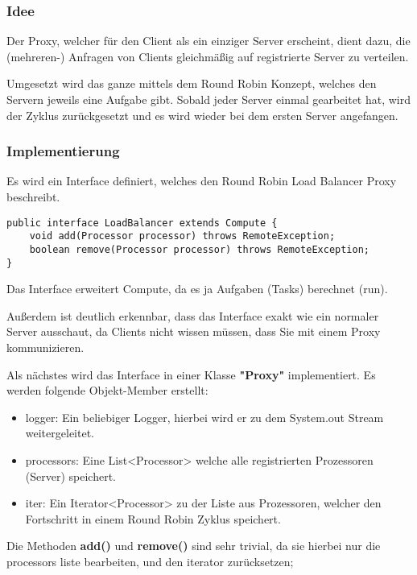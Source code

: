 \subsubsection{Idee}
Der Proxy, welcher für den Client als ein einziger Server erscheint, dient dazu, die (mehreren-) Anfragen von Clients gleichmäßig auf registrierte Server zu verteilen.

Umgesetzt wird das ganze mittels dem Round Robin Konzept, welches den Servern jeweils eine Aufgabe gibt. Sobald jeder Server einmal gearbeitet hat, wird der Zyklus zurückgesetzt und es wird wieder bei dem ersten Server angefangen.

\subsubsection{Implementierung}
Es wird ein Interface definiert, welches den Round Robin Load Balancer Proxy beschreibt.

\begin{lstlisting}[style=Java, caption=Proxy Implementation - LoadBalancer Interface]
public interface LoadBalancer extends Compute {
    void add(Processor processor) throws RemoteException;
	boolean remove(Processor processor) throws RemoteException;
}
\end{lstlisting}

Das Interface erweitert Compute, da es ja Aufgaben (Tasks) berechnet (run).

Außerdem ist deutlich erkennbar, dass das Interface exakt wie ein normaler Server ausschaut, da Clients nicht wissen müssen, dass Sie mit einem Proxy kommunizieren.

Als nächstes wird das Interface in einer Klasse \textbf{"Proxy"} implementiert.
Es werden folgende Objekt-Member erstellt:

\begin{itemize}
	\item logger: Ein beliebiger Logger, hierbei wird er zu dem System.out Stream weitergeleitet.
	\item processors: Eine List<Processor> welche alle registrierten Prozessoren (Server) speichert.
	\item iter: Ein Iterator<Processor> zu der Liste aus Prozessoren, welcher den Fortschritt in einem Round Robin Zyklus speichert.
\end{itemize}

Die Methoden \textbf{add()} und \textbf{remove()} sind sehr trivial, da sie hierbei nur die processors liste bearbeiten, und den iterator zurücksetzen;

